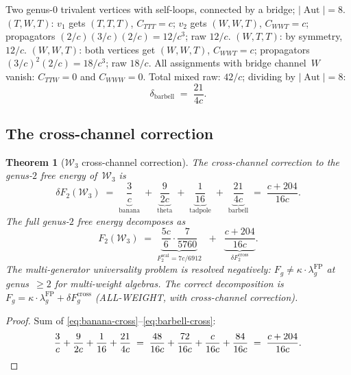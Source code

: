 \documentclass[11pt,reqno]{amsart}
\newtheorem{theorem}{Theorem}[section]
\theoremstyle{definition}
\theoremstyle{remark}
\newcommand{\cW}{\mathcal{W}}
\DeclareMathOperator{\Aut}{Aut}
\numberwithin{equation}{section}
\begin{document}
Two genus-$0$ trivalent vertices with self-loops, connected
by a bridge; $|\Aut| = 8$.
$(T,W,T)$: $v_1$ gets $(T,T,T)$, $C_{TTT} = c$;
$v_2$ gets $(W,W,T)$, $C_{WWT} = c$; propagators
$(2/c)(3/c)(2/c) = 12/c^3$; raw $12/c$.
$(W,T,T)$: by symmetry, $12/c$.
$(W,W,T)$: both vertices get $(W,W,T)$, $C_{WWT} = c$;
propagators $(3/c)^2(2/c) = 18/c^3$; raw $18/c$.
All assignments with bridge channel~$W$ vanish:
$C_{TTW} = 0$ and $C_{WWW} = 0$.
Total mixed raw: $42/c$; dividing by $|\Aut| = 8$:
\begin{equation}\label{eq:barbell-cross}
 \delta_{\mathrm{barbell}} \;=\; \frac{21}{4c}.
\end{equation}

\subsection{The cross-channel
correction}\label{subsec:cross-total}

\begin{theorem}[$\cW_3$ cross-channel
correction]\label{thm:genus2}
The cross-channel correction to the genus-$2$ free energy
of~$\cW_3$ is
\begin{equation}\label{eq:cross-channel-total}
 \delta F_2(\cW_3)
 \;=\;
 \underbrace{\frac{3}{c}}_{\text{banana}}
 \;+\;
 \underbrace{\frac{9}{2c}}_{\text{theta}}
 \;+\;
 \underbrace{\frac{1}{16}}_{\text{tadpole}}
 \;+\;
 \underbrace{\frac{21}{4c}}_{\text{barbell}}
 \;=\;
 \frac{c + 204}{16c}.
\end{equation}
The full genus-$2$ free energy decomposes as
\[
 F_2(\cW_3)
 \;=\;
 \underbrace{\frac{5c}{6}\cdot\frac{7}{5760}}_{\displaystyle
 F_2^{\mathrm{scal}} = 7c/6912}
 \;\;+\;\;
 \underbrace{\frac{c + 204}{16c}}_{\displaystyle
 \delta F_2^{\mathrm{cross}}}.
\]
The multi-generator universality problem is resolved
negatively: $F_g \ne \kappa \cdot
\lambda_g^{\mathrm{FP}}$ at genus~$\ge 2$ for multi-weight
algebras. The correct decomposition is
$F_g = \kappa \cdot \lambda_g^{\mathrm{FP}} +
\delta F_g^{\mathrm{cross}}$ \textup{(}ALL-WEIGHT, with
cross-channel correction\textup{)}.
\end{theorem}

\begin{proof}
Sum of \eqref{eq:banana-cross}--\eqref{eq:barbell-cross}:
\[
 \frac{3}{c} + \frac{9}{2c} + \frac{1}{16} + \frac{21}{4c}
 \;=\;
 \frac{48}{16c} + \frac{72}{16c} + \frac{c}{16c}
 + \frac{84}{16c}
 \;=\;
 \frac{c + 204}{16c}.
 \qedhere
\]
\end{proof}
\end{document}
